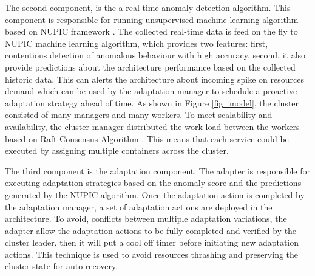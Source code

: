 \documentclass[sigconf]{acmart}
\begin{document}
The second component, is the a real-time anomaly detection algorithm. This component is responsible for running unsupervised machine learning algorithm based on NUPIC framework \cite{AHMAD2017134}. The collected real-time data is feed on the fly to NUPIC machine learning algorithm, which provides two features: first, contentious detection of anomalous behaviour with high accuracy. second, it also provide predictions about the architecture performance based on the collected historic data. This can alerts the architecture about incoming spike on resources demand which can be used by the adaptation manager to schedule a proactive adaptation strategy ahead of time. As shown in Figure \ref{fig_model}, the cluster consisted of many managers and many workers. To meet scalability and availability, the cluster manager distributed the work load between the workers based on Raft Consensus Algorithm \cite{ongaro2015raft}. This means that each  service could be executed by assigning multiple containers across the cluster.   


The third component is the adaptation component. The adapter is responsible for executing adaptation strategies based on the anomaly score and the predictions generated by the NUPIC algorithm. Once the adaptation action is completed by the adaptation manager, a set of adaptation actions are deployed in the architecture. To avoid, conflicts between multiple adaptation variations, the adapter allow the adaptation actions to be fully completed and verified by the cluster leader, then it will put a cool off timer before initiating new adaptation actions. This technique is used to avoid resources thrashing and preserving the cluster state for auto-recovery.
\end{document}
